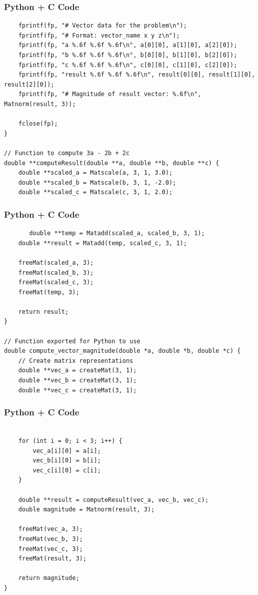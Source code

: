 \documentclass{beamer}
\begin{document}
\begin{frame}[fragile]
    \frametitle{Python + C Code}
    \begin{lstlisting}   
    fprintf(fp, "# Vector data for the problem\n");
    fprintf(fp, "# Format: vector_name x y z\n");
    fprintf(fp, "a %.6f %.6f %.6f\n", a[0][0], a[1][0], a[2][0]);
    fprintf(fp, "b %.6f %.6f %.6f\n", b[0][0], b[1][0], b[2][0]);
    fprintf(fp, "c %.6f %.6f %.6f\n", c[0][0], c[1][0], c[2][0]);
    fprintf(fp, "result %.6f %.6f %.6f\n", result[0][0], result[1][0], result[2][0]);
    fprintf(fp, "# Magnitude of result vector: %.6f\n", Matnorm(result, 3));
    
    fclose(fp);
}

// Function to compute 3a - 2b + 2c
double **computeResult(double **a, double **b, double **c) {
    double **scaled_a = Matscale(a, 3, 1, 3.0);
    double **scaled_b = Matscale(b, 3, 1, -2.0);
    double **scaled_c = Matscale(c, 3, 1, 2.0);
    \end{lstlisting}
\end{frame}


\begin{frame}[fragile]
    \frametitle{Python + C Code}
    \begin{lstlisting}
       double **temp = Matadd(scaled_a, scaled_b, 3, 1);
    double **result = Matadd(temp, scaled_c, 3, 1);
    
    freeMat(scaled_a, 3);
    freeMat(scaled_b, 3);
    freeMat(scaled_c, 3);
    freeMat(temp, 3);
    
    return result;
}

// Function exported for Python to use
double compute_vector_magnitude(double *a, double *b, double *c) {
    // Create matrix representations
    double **vec_a = createMat(3, 1);
    double **vec_b = createMat(3, 1);
    double **vec_c = createMat(3, 1);
    \end{lstlisting}
\end{frame}



\begin{frame}[fragile]
    \frametitle{Python + C Code}
    \begin{lstlisting}
       
    for (int i = 0; i < 3; i++) {
        vec_a[i][0] = a[i];
        vec_b[i][0] = b[i];
        vec_c[i][0] = c[i];
    }
    
    double **result = computeResult(vec_a, vec_b, vec_c);
    double magnitude = Matnorm(result, 3);
    
    freeMat(vec_a, 3);
    freeMat(vec_b, 3);
    freeMat(vec_c, 3);
    freeMat(result, 3);
    
    return magnitude;
}
\end{lstlisting}
\end{frame}
\end{document}
